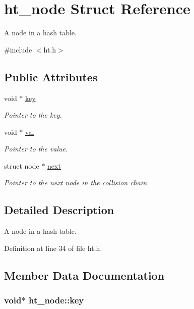 \hypertarget{structht__node}{
\section{ht\_\-node Struct Reference}
\label{structht__node}
}


A node in a hash table.  




{\ttfamily \#include $<$ht.h$>$}

\subsection*{Public Attributes}
\begin{DoxyCompactItemize}
\item 
void $\ast$ \hyperlink{structht__node_a7ae2a850d1c6e0abb86b3d901fb5d16b}{key}
\begin{DoxyCompactList}\small\item\em Pointer to the key. \item\end{DoxyCompactList}\item 
void $\ast$ \hyperlink{structht__node_a0e050852d00670316f005463a7d749f8}{val}
\begin{DoxyCompactList}\small\item\em Pointer to the value. \item\end{DoxyCompactList}\item 
struct node $\ast$ \hyperlink{structht__node_ae1c5c426c9f752a40b5db427b506060e}{next}
\begin{DoxyCompactList}\small\item\em Pointer to the next node in the collision chain. \item\end{DoxyCompactList}\end{DoxyCompactItemize}


\subsection{Detailed Description}
A node in a hash table. 

Definition at line 34 of file ht.h.



\subsection{Member Data Documentation}
\hypertarget{structht__node_a7ae2a850d1c6e0abb86b3d901fb5d16b}{
\subsubsection[{key}]{\setlength{\rightskip}{0pt plus 5cm}void$\ast$ {\bf ht\_\-node::key}}}
\label{structht__node_a7ae2a850d1c6e0abb86b3d901fb5d16b}


